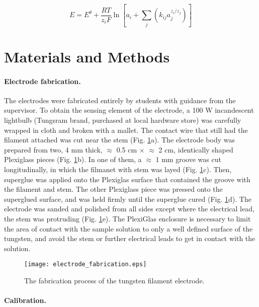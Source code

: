 \documentclass[manuscript=article, journal=jceda8]{achemso}
\begin{document}
\begin{equation}
E=E^\theta + \frac{RT}{z_iF} \ln \left [ a_i + \sum_{j} \left ( k_{ij}a_j^{z_i/z_j} \right ) \right ]
\end{equation}


\section{Materials and Methods}
\paragraph{Electrode fabrication.}

The electrodes were fabricated entirely by students with guidance from the supervisor. To obtain the sensing element of the electrode, a 100 W incandescent lightbulb (Tungsram brand, purchased at local hardware store) was carefully wrapped in cloth and broken with a mallet. The contact wire that still had the filament attached was cut near the stem (Fig. \ref{fig:fabrication}a). The electrode body was prepared from two, 4 mm thick, $\approx$ 0.5 cm $\times$ $\approx$ 2 cm, identically shaped Plexiglass pieces (Fig. \ref{fig:fabrication}b). In one of them, a $\approx$ 1 mm groove was cut longitudinally, in which the filmanet with stem was layed (Fig. \ref{fig:fabrication}c). Then, superglue was applied onto the Plexiglas surface that contained the groove with the filament and stem. The other Plexiglass piece was pressed onto the superglued surface, and was held firmly until the superglue cured (Fig. \ref{fig:fabrication}d). The electrode was sanded and polished from all sides except where the electrical lead, the stem was protruding (Fig. \ref{fig:fabrication}e). The PlexiGlas enclosure is necessary to limit the area of contact with the sample solution to only a well defined surface of the tungsten, and avoid the stem or further electrical leads to get in contact with the solution.

\begin{figure}
\centering
\texttt{[image: electrode\_fabrication.eps]}
\caption{The fabrication process of the tungsten filament electrode. }
\label{fig:fabrication}
\end{figure}

\paragraph{Calibration.}
\end{document}
